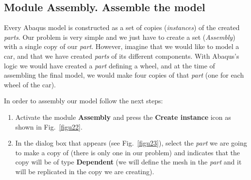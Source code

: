 \subsection{Module Assembly. Assemble the model}
Every Abaqus model is constructed as a set of copies
(\textit{instances}) of the created \textit{parts}. Our problem is
very simple and we just have to create a set (\textit{Assembly}) with
a single copy of our \textit {part}. However, imagine that we would
like to model a car, and that we have created \textit{parts} of its
different components. With Abaqus's logic we would have created a
\textit{part} defining a wheel, and at the time of assembling the
final model, we would make four copies of that \textit{part} (one for
each wheel of the car).


In order to assembly our model follow the next steps:
\begin{enumerate}
\item Activate the module \textbf{Assembly} and press the
  \textbf{Create instance} icon as shown in Fig.~\ref{figu22}.
\item In the dialog box that appears (see Fig.~\ref{figu23}), select
  the \textit{part} we are going to make a copy of (there is only one
  in our problem) and indicates that the copy will be of type
  \textbf{Dependent} (we will define the mesh in the \textit {part}
  and it will be replicated in the copy we are creating).
\end{enumerate}

